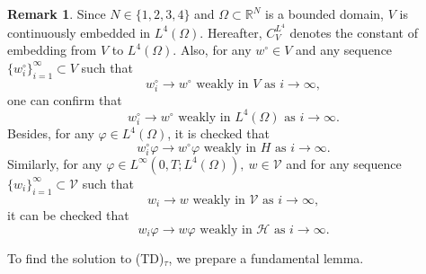 \documentclass{sinst}
\numberwithin{equation}{section}
\theoremstyle{plain}
\theoremstyle{definition}
\newtheorem{rem}{Remark}
\def\R{\mathbb{R}}
\def\sH{\mathscr{H}}
\def\sV{\mathscr{V}}
\begin{document}
\begin{rem} \label{emb}
  Since $N \in \{ 1,2,3,4 \}$ and $\Omega \subset \R^N$ is a bounded domain, $V$ is continuously embedded in $L^4(\Omega)$. Hereafter, $C_V^{L^4}$ denotes the constant of embedding from $V$ to $L^4(\Omega)$. Also, for any $w^\circ \in V$ and any sequence $\{ w_i^\circ \}_{i = 1}^\infty \subset V$ such that 
    \begin{equation}
    w_i^\circ \to w^\circ \mbox{ weakly in } V \mbox{ as } i \to \infty,
  \end{equation}
  one can confirm that
  \begin{equation}
    w_i^\circ \to w^\circ \mbox{ weakly in } L^4(\Omega) \mbox{ as } i \to \infty. 
  \end{equation}
  Besides, for any $\varphi \in L^4(\Omega)$, it is checked that
  \begin{equation}
    w_i^\circ \varphi \to w^\circ \varphi \mbox{ weakly in } H \mbox{ as } i \to \infty. \label{emb01}
  \end{equation}
  Similarly, for any $\varphi \in L^\infty(0,T;L^4(\Omega)), \ w \in \sV$ and for any sequence $\{ w_i \}_{i=1}^\infty \subset \sV$ such that
  \begin{equation}
    w_i \to w \mbox{ weakly in } \sV \mbox{ as } i \to \infty,
  \end{equation} 
  it can be checked that
  \begin{equation}
    w_i \varphi \to w \varphi \mbox{ weakly in } \sH \mbox{ as } i \to \infty. \label{emb02}
  \end{equation}
  
\end{rem}

To find the solution to (TD)$_\tau$, we prepare a fundamental lemma.
\end{document}

